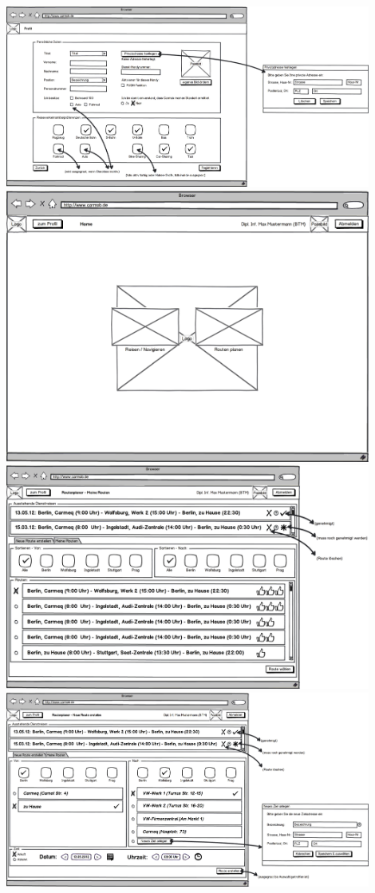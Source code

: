 \documentclass[12pt,a4paper]{article}
\begin{document}
\begin{center}
\includegraphics[width=12cm]{08_konvergenter_paperprototyp01_002.png}\\
\includegraphics[width=12cm]{08_konvergenter_paperprototyp01_003.png}\\
\includegraphics[width=12cm]{08_konvergenter_paperprototyp01_004.png}\\
\includegraphics[width=12cm]{08_konvergenter_paperprototyp01_005.png}\\

\end{center}
\end{document}
